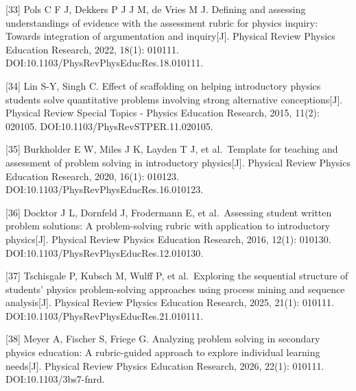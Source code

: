 \documentclass[
  12pt,
  a4paper,twoside,openany]{ctexbook}
\begin{document}
{[}33{]} Pols C F J, Dekkers P J J M, de Vries M J. Defining and
assessing understandings of evidence with the assessment rubric for
physics inquiry: Towards integration of argumentation and
inquiry{[}J{]}. Physical Review Physics Education Research, 2022, 18(1):
010111. DOI:10.1103/PhysRevPhysEducRes.18.010111.

{[}34{]} Lin S-Y, Singh C. Effect of scaffolding on helping introductory
physics students solve quantitative problems involving strong
alternative conceptions{[}J{]}. Physical Review Special Topics - Physics
Education Research, 2015, 11(2): 020105.
DOI:10.1103/PhysRevSTPER.11.020105.

{[}35{]} Burkholder E W, Miles J K, Layden T J, et al.~Template for
teaching and assessment of problem solving in introductory
physics{[}J{]}. Physical Review Physics Education Research, 2020, 16(1):
010123. DOI:10.1103/PhysRevPhysEducRes.16.010123.

{[}36{]} Docktor J L, Dornfeld J, Frodermann E, et al.~Assessing student
written problem solutions: A problem-solving rubric with application to
introductory physics{[}J{]}. Physical Review Physics Education Research,
2016, 12(1): 010130. DOI:10.1103/PhysRevPhysEducRes.12.010130.

{[}37{]} Tschisgale P, Kubsch M, Wulff P, et al.~Exploring the
sequential structure of students' physics problem-solving approaches
using process mining and sequence analysis{[}J{]}. Physical Review
Physics Education Research, 2025, 21(1): 010111.
DOI:10.1103/PhysRevPhysEducRes.21.010111.

{[}38{]} Meyer A, Fischer S, Friege G. Analyzing problem solving in
secondary physics education: A rubric-guided approach to explore
individual learning needs{[}J{]}. Physical Review Physics Education
Research, 2026, 22(1): 010111. DOI:10.1103/3bs7-fnrd.

\backmatter
\endgroup
\end{document}
